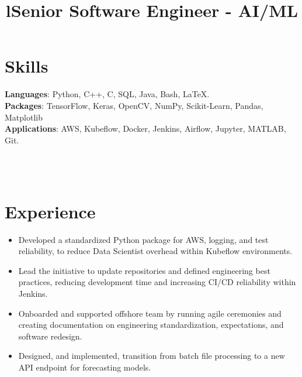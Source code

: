 \documentclass[margin]{res}
\begin{document}
\begin{resume}

\section{Skills}
\phantom{spacing}
\par
\textbf{Languages}: Python, C++, C, SQL, Java, Bash, \LaTeX.
\\
\textbf{Packages}: TensorFlow, Keras, OpenCV, NumPy, Scikit-Learn, Pandas, Matplotlib
\\
\textbf{Applications}: AWS, Kubeflow, Docker, Jenkins, Airflow, Jupyter, MATLAB, Git. 

\begin{format}
\title{l}\\
\\
\end{format}

\section{Experience}
\phantom{spacing}
\title{\textbf{Senior Software Engineer - AI/ML}}
\begin{position}
\begin{itemize}[noitemsep, topsep=0pt]
\item Developed a standardized Python package for AWS, logging, and test reliability, to reduce Data Scientist overhead within Kubeflow environments.
\item Lead the initiative to update repositories and defined engineering best practices, reducing development time and increasing CI/CD reliability within Jenkins. 
\item Onboarded and supported offshore team by running agile ceremonies and creating documentation on engineering standardization, expectations, and software redesign.
\item Designed, and implemented, transition from batch file processing to a new API endpoint for forecasting models.
\end{itemize}
\end{position}



\end{resume}
\end{document}
